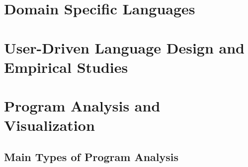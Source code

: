 \documentclass{article}
\begin{document}
\section{Domain Specific Languages}

\section{User-Driven Language Design and Empirical Studies}

\section{Program Analysis and Visualization}

\subsection{Main Types of Program Analysis}
\end{document}

